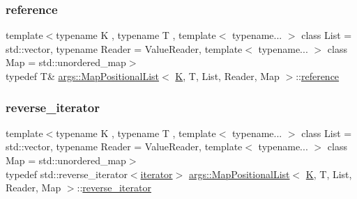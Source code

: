 \mbox{\label{classargs_1_1_map_positional_list_acabe5d01f2f750a05a8a6549a61a8120}} 
\subsubsection{\texorpdfstring{reference}{reference}}
{\footnotesize\ttfamily template$<$typename K , typename T , template$<$ typename... $>$ class List = std\+::vector, typename Reader  = Value\+Reader, template$<$ typename... $>$ class Map = std\+::unordered\+\_\+map$>$ \\
typedef T\& \hyperlink{classargs_1_1_map_positional_list}{args\+::\+Map\+Positional\+List}$<$ \hyperlink{cgal__test_8cpp_a891e241aa245ae63618f03737efba309}{K}, T, List, Reader, Map $>$\+::\hyperlink{classargs_1_1_map_positional_list_acabe5d01f2f750a05a8a6549a61a8120}{reference}}

\mbox{\label{classargs_1_1_map_positional_list_ad12f9031955b2dc9a3d20304a908bcea}} 
\subsubsection{\texorpdfstring{reverse\+\_\+iterator}{reverse\_iterator}}
{\footnotesize\ttfamily template$<$typename K , typename T , template$<$ typename... $>$ class List = std\+::vector, typename Reader  = Value\+Reader, template$<$ typename... $>$ class Map = std\+::unordered\+\_\+map$>$ \\
typedef std\+::reverse\+\_\+iterator$<$\hyperlink{classargs_1_1_map_positional_list_a4e3fbeb6f894505ce48d35fe76dc157a}{iterator}$>$ \hyperlink{classargs_1_1_map_positional_list}{args\+::\+Map\+Positional\+List}$<$ \hyperlink{cgal__test_8cpp_a891e241aa245ae63618f03737efba309}{K}, T, List, Reader, Map $>$\+::\hyperlink{classargs_1_1_map_positional_list_ad12f9031955b2dc9a3d20304a908bcea}{reverse\+\_\+iterator}}

\mbox{\label{classargs_1_1_map_positional_list_a217bf984e4c1108f5e4785cef1de1a95}} 
